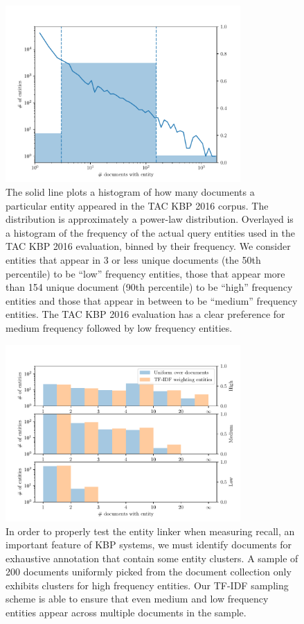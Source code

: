 \begin{figure}
  \centering
  \includegraphics[width=0.8\textwidth]{figures/analysis/distribution}
  \caption[TAC KBP 2016 Query entity distribution]{\label{fig:kbpo:distribution}
    The solid line plots a histogram of how many documents a particular entity appeared in the TAC KBP 2016 corpus.
    The distribution is approximately a power-law distribution.
    Overlayed is a histogram of the frequency of the actual query entities used in the TAC KBP 2016 evaluation, binned by their frequency. We consider entities that appear in 3 or less unique documents (the 50th percentile) to be ``low'' frequency entities, those that appear more than 154 unique document (90th percentile) to be ``high'' frequency entities and those that appear in between to be ``medium'' frequency entities.
    The TAC KBP 2016 evaluation has a clear preference for medium frequency followed by low frequency entities.
  }
\end{figure}

\begin{figure}
  \centering
  \includegraphics[width=0.8\textwidth]{figures/analysis/exhaustive_entity_cross}
  \caption[Comparison of document sampling distributions]{\label{fig:kbpo:exhaustive_entity_cross}
  In order to properly test the entity linker when measuring recall, an important feature of KBP systems, we must identify documents for exhaustive annotation that contain some entity clusters.
  A sample of 200 documents uniformly picked from the document collection only exhibits clusters for high frequency entities.
  Our TF-IDF sampling scheme is able to ensure that even medium and low frequency entities appear across multiple documents in the sample.
  }
\end{figure}

